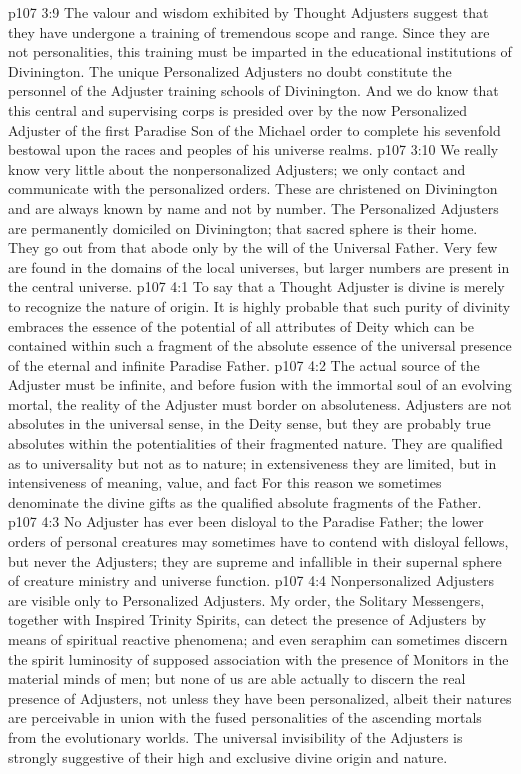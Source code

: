 \vs p107 3:9 The valour and wisdom exhibited by Thought Adjusters suggest that they have undergone a training of tremendous scope and range. Since they are not personalities, this training must be imparted in the educational institutions of Divinington. The unique Personalized Adjusters no doubt constitute the personnel of the Adjuster training schools of Divinington. And we do know that this central and supervising corps is presided over by the now Personalized Adjuster of the first Paradise Son of the Michael order to complete his sevenfold bestowal upon the races and peoples of his universe realms.
\vs p107 3:10 We really know very little about the nonpersonalized Adjusters; we only contact and communicate with the personalized orders. These are christened on Divinington and are always known by name and not by number. The Personalized Adjusters are permanently domiciled on Divinington; that sacred sphere is their home. They go out from that abode only by the will of the Universal Father. Very few are found in the domains of the local universes, but larger numbers are present in the central universe.
\vs p107 4:1 To say that a Thought Adjuster is divine is merely to recognize the nature of origin. It is highly probable that such purity of divinity embraces the essence of the potential of all attributes of Deity which can be contained within such a fragment of the absolute essence of the universal presence of the eternal and infinite Paradise Father.
\vs p107 4:2 The actual source of the Adjuster must be infinite, and before fusion with the immortal soul of an evolving mortal, the reality of the Adjuster must border on absoluteness. Adjusters are not absolutes in the universal sense, in the Deity sense, but they are probably true absolutes within the potentialities of their fragmented nature. They are qualified as to universality but not as to nature; in extensiveness they are limited, but in intensiveness of meaning, value, and fact  For this reason we sometimes denominate the divine gifts as the qualified absolute fragments of the Father.
\vs p107 4:3 No Adjuster has ever been disloyal to the Paradise Father; the lower orders of personal creatures may sometimes have to contend with disloyal fellows, but never the Adjusters; they are supreme and infallible in their supernal sphere of creature ministry and universe function.
\vs p107 4:4 \pc Nonpersonalized Adjusters are visible only to Personalized Adjusters. My order, the Solitary Messengers, together with Inspired Trinity Spirits, can detect the presence of Adjusters by means of spiritual reactive phenomena; and even seraphim can sometimes discern the spirit luminosity of supposed association with the presence of Monitors in the material minds of men; but none of us are able actually to discern the real presence of Adjusters, not unless they have been personalized, albeit their natures are perceivable in union with the fused personalities of the ascending mortals from the evolutionary worlds. The universal invisibility of the Adjusters is strongly suggestive of their high and exclusive divine origin and nature.
